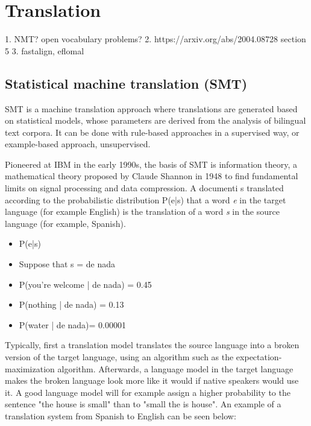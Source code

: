 %
%

\chapter{Translation}\label{sec:translation}

	1. NMT? open vocabulary problems?
	2. https://arxiv.org/abs/2004.08728 section 5
 	3. fastalign, eflomal

\section{Statistical machine translation (SMT)}

SMT is a machine translation approach where translations are generated based on statistical models, whose parameters are derived from the analysis of bilingual text corpora. It can be done with rule-based approaches in a supervised way, or example-based approach, unsupervised.

Pioneered at IBM in the early 1990s, the basis of SMT is information theory, a mathematical theory proposed by Claude Shannon in 1948 to find fundamental limits on signal processing and data compression. A documenti s translated according to the probabilistic distribution P(e|s) that a word \emph{e} in the target language (for example English) is the translation of a word \emph{s} in the source language (for example, Spanish).

\begin{itemize}
	\item P(e|s)
	\item Suppose that s = de nada
	\item P(you're welcome | de nada) = 0.45
	\item P(nothing | de nada) = 0.13
	\item P(water | de nada)= 0.00001
\end{itemize}

Typically, first a translation model translates the source language into a broken version of the target language, using an algorithm such as the expectation-maximization algorithm. Afterwards, a language model in the target language makes the broken language look more like it would if native speakers would use it. A good language model will for example assign a higher probability to the sentence "the house is small" than to "small the is house". An example of a translation system from Spanish to English can be seen below:

